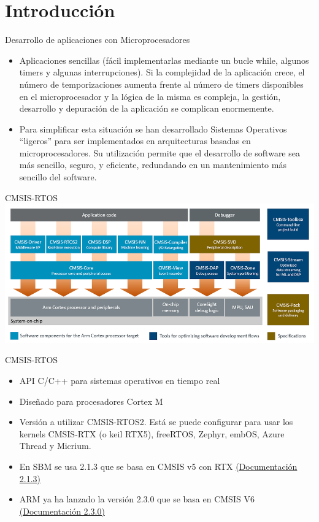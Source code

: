\section{Introducción}

\begin{frame}{Desarrollo de aplicaciones con Microprocesadores}
    \begin{itemize}
        \item Aplicaciones sencillas (fácil implementarlas mediante un bucle while, algunos timers y algunas interrupciones).
Si la complejidad de la aplicación crece, el número de temporizaciones aumenta frente al número de timers disponibles en el microprocesador y la lógica de la misma es compleja, la gestión, desarrollo y depuración de la aplicación se complican enormemente.
        \item Para simplificar esta situación se han desarrollado Sistemas Operativos “ligeros” para ser implementados en arquitecturas basadas en microprocesadores. Su utilización permite que el desarrollo de software sea más sencillo, seguro, y eficiente, redundando en un mantenimiento más sencillo del software.      
    \end{itemize}
     \centering

\end{frame}

\begin{frame}{CMSIS-RTOS}
    \includegraphics[scale=0.35]{presentation/cmsis_components.png}
\end{frame}

\begin{frame}{CMSIS-RTOS}
    \begin{itemize}
      \item API C/C++ para sistemas operativos en tiempo real
      \item Diseñado para procesadores Cortex M
      \item Versión a utilizar CMSIS-RTOS2. Está se puede configurar para usar los kernels CMSIS-RTX (o keil RTX5), freeRTOS, Zephyr, embOS, Azure Thread y Micrium.
      \item En SBM se usa 2.1.3 que se basa en CMSIS v5 con RTX \href{https://arm-software.github.io/CMSIS_5/RTOS2/html/index.html}{(Documentación 2.1.3)}
      \item ARM ya ha lanzado la versión 2.3.0 que se basa en CMSIS V6 \href{https://arm-software.github.io/CMSIS_6/latest/RTOS2/index.html}{(Documentación 2.3.0)}
    \end{itemize}
    
\end{frame}

